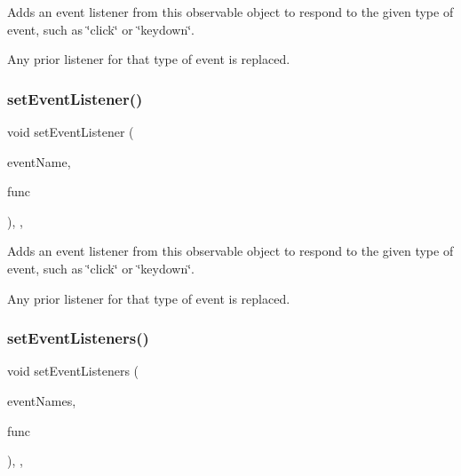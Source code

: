 Adds an event listener from this observable object to respond to the given type of event, such as \char`\"{}click\char`\"{} or \char`\"{}keydown\char`\"{}. 

Any prior listener for that type of event is replaced. \mbox{\label{classGObservable_abac4cb9f9e626e010e87f5d91573c8a5}} 
\subsubsection{\texorpdfstring{set\+Event\+Listener()}{setEventListener()}\hspace{0.1cm}{\footnotesize\ttfamily [2/2]}}
{\footnotesize\ttfamily void set\+Event\+Listener (\begin{DoxyParamCaption}\item[{const std\+::string \&}]{event\+Name,  }\item[{G\+Event\+Listener\+Void}]{func }\end{DoxyParamCaption})\hspace{0.3cm}{\ttfamily [protected]}, {\ttfamily [virtual]}, {\ttfamily [inherited]}}



Adds an event listener from this observable object to respond to the given type of event, such as \char`\"{}click\char`\"{} or \char`\"{}keydown\char`\"{}. 

Any prior listener for that type of event is replaced. \mbox{\label{classGObservable_afa388d69c33c718cf035774604065604}} 
\subsubsection{\texorpdfstring{set\+Event\+Listeners()}{setEventListeners()}\hspace{0.1cm}{\footnotesize\ttfamily [1/2]}}
{\footnotesize\ttfamily void set\+Event\+Listeners (\begin{DoxyParamCaption}\item[{std\+::initializer\+\_\+list$<$ std\+::string $>$}]{event\+Names,  }\item[{G\+Event\+Listener}]{func }\end{DoxyParamCaption})\hspace{0.3cm}{\ttfamily [protected]}, {\ttfamily [virtual]}, {\ttfamily [inherited]}}



